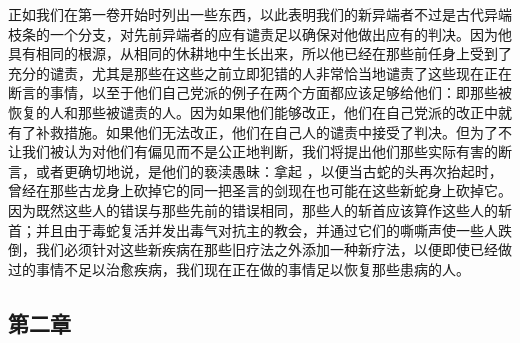 正如我们在第一卷开始时列出一些东西，以此表明我们的新异端者不过是古代异端枝条的一个分支，对先前异端者的应有谴责足以确保对他做出应有的判决。因为他具有相同的根源，从相同的休耕地中生长出来，所以他已经在那些前任身上受到了充分的谴责，尤其是那些在这些之前立即犯错的人非常恰当地谴责了这些现在正在断言的事情，以至于他们自己党派的例子在两个方面都应该足够给他们：即那些被恢复的人和那些被谴责的人。因为如果他们能够改正，他们在自己党派的改正中就有了补救措施。如果他们无法改正，他们在自己人的谴责中接受了判决。但为了不让我们被认为对他们有偏见而不是公正地判断，我们将提出他们那些实际有害的断言，或者更确切地说，是他们的亵渎愚昧：拿起 ，以便当古蛇的头再次抬起时，曾经在那些古龙身上砍掉它的同一把圣言的剑现在也可能在这些新蛇身上砍掉它。因为既然这些人的错误与那些先前的错误相同，那些人的斩首应该算作这些人的斩首；并且由于毒蛇复活并发出毒气对抗主的教会，并通过它们的嘶嘶声使一些人跌倒，我们必须针对这些新疾病在那些旧疗法之外添加一种新疗法，以便即使已经做过的事情不足以治愈疾病，我们现在正在做的事情足以恢复那些患病的人。\par


\subsection{第二章}

\par

